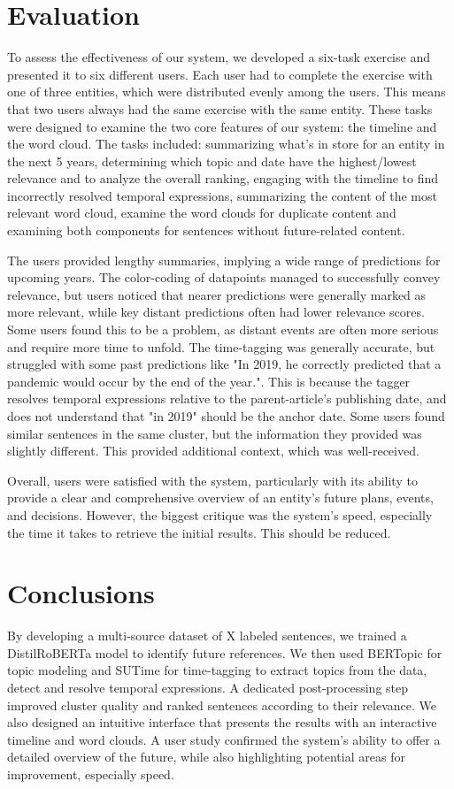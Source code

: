 \documentclass[sigconf]{acmart}
\begin{document}
\section{Evaluation}
To assess the effectiveness of our system, we developed a six-task exercise and presented it to six different users. Each user had to complete the exercise with one of three entities, which were distributed evenly among the users. This means that two users always had the same exercise with the same entity.
These tasks were designed to examine the two core features of our system: the timeline and the word cloud.
The tasks included: summarizing what's in store for an entity in the next 5 years, determining which topic and date have the highest/lowest relevance and to analyze the overall ranking, engaging with the timeline to find incorrectly resolved temporal expressions, summarizing the content of the most relevant word cloud, examine the word clouds for duplicate content and examining both components for sentences without future-related content.

The users provided lengthy summaries, implying a wide range of predictions for upcoming years. The color-coding of datapoints managed to successfully convey relevance, but users noticed that nearer predictions were generally marked as more relevant, while key distant predictions often had lower relevance scores. Some users found this to be a problem, as distant events are often more serious and require more time to unfold. The time-tagging was generally accurate, but struggled with some past predictions like "In 2019, he correctly predicted that a pandemic would occur by the end of the year.". This is because the tagger resolves temporal expressions relative to the parent-article's publishing date, and does not understand that "in 2019" should be the anchor date. Some users found similar sentences in the same cluster, but the information they provided was slightly different. This provided additional context, which was well-received.

Overall, users were satisfied with the system, particularly with its ability to provide a clear and comprehensive overview of an entity's future plans, events, and decisions. However, the biggest critique was the system's speed, especially the time it takes to retrieve the initial results. This should be reduced.


\section{Conclusions}
By developing a multi-source dataset of X labeled sentences, we trained a DistilRoBERTa model to identify future references.  We then used BERTopic for topic modeling and SUTime for time-tagging to extract topics from the data, detect and resolve temporal expressions. A dedicated post-processing step improved cluster quality and ranked sentences according to their relevance. We also designed an intuitive interface that presents the results with an interactive timeline and word clouds. A user study confirmed the system's ability to offer a detailed overview of the future, while also highlighting potential areas for improvement, especially speed.






\end{document}
